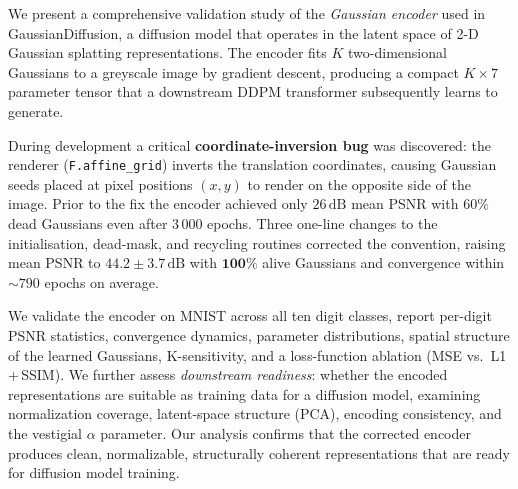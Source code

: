 We present a comprehensive validation study of the \emph{Gaussian encoder} used in
GaussianDiffusion, a diffusion model that operates in the latent space of 2-D Gaussian
splatting representations.  The encoder fits $K$ two-dimensional Gaussians to a greyscale
image by gradient descent, producing a compact $K\!\times\!7$ parameter tensor that
a downstream DDPM transformer subsequently learns to generate.

During development a critical \textbf{coordinate-inversion bug} was discovered: the
renderer (\texttt{F.affine\_grid}) inverts the translation coordinates, causing
Gaussian seeds placed at pixel positions $(x, y)$ to render on the opposite side of
the image.  Prior to the fix the encoder achieved only $26\,\mathrm{dB}$ mean PSNR
with $60\%$ dead Gaussians even after $3\,000$ epochs.  Three one-line changes to
the initialisation, dead-mask, and recycling routines corrected the convention, raising
mean PSNR to $\mathbf{44.2 \pm 3.7\,\mathrm{dB}}$ with $\mathbf{100\%}$ alive
Gaussians and convergence within ${\sim}790$ epochs on average.

We validate the encoder on MNIST across all ten digit classes, report per-digit PSNR
statistics, convergence dynamics, parameter distributions, spatial structure of the
learned Gaussians, K-sensitivity, and a loss-function ablation (MSE vs.\ L1\,+\,SSIM).
We further assess \emph{downstream readiness}: whether the encoded representations
are suitable as training data for a diffusion model, examining normalization coverage,
latent-space structure (PCA), encoding consistency, and the vestigial $\alpha$ parameter.
Our analysis confirms that the corrected encoder produces clean, normalizable, structurally
coherent representations that are ready for diffusion model training.
